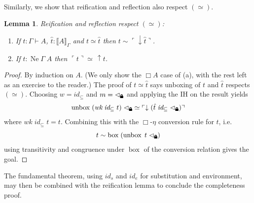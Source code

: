 \documentclass[12pt,twoside,openright]{report}
\numberwithin{equation}{chapter}
\numberwithin{figure}{chapter}
\numberwithin{table}{chapter}
\newtheorem{lemma}[theorem]{Lemma}
\theoremstyle{definition}\newtheorem{definition}{Definition}
\newcommand{\lock}{\text{\tikz[baseline]{
      \fill[rounded corners=.1ex] (-.75ex,0) rectangle (.75ex,1ex);
      \draw[line width=.3ex] (-.4ex,.5ex) -- ++(0,.75ex) arc (180:0:.4ex) -- ++(0,-.75ex);
}}}
\begin{document}
Similarly, we show that reification and reflection also respect $(\simeq)$.
\begin{lemma}
  Reification and reflection respect $(\simeq)$:
  \begin{enumerate}
    \renewcommand{\theenumi}{\alph{enumi}}
  \item If $t : \Gamma \vdash A$, $\hat t : \llbracket A \rrbracket_\Gamma$
    and $t \simeq \hat t$ then $t \sim \ulcorner \downarrow\hat t \urcorner$.
  \item If $t : \operatorname{Ne} \Gamma \; A$ then $\ulcorner t \urcorner \simeq \, \uparrow t$.
  \end{enumerate}
\end{lemma}
\begin{proof}
  By induction on $A$.
  (We only show the $\Box A$ case of (a),
  with the rest left as an exercise to the reader.)
  The proof of $t \simeq \hat t$ says unboxing of $t$ and $\hat t$ respects $(\simeq)$.
  Choosing $w = \textit{id}_\subseteq$ and $m = \lhd_\lock$
  and applying the IH on the result yields
  $$ \operatorname{unbox} \; (\textit{wk} \; \textit{id}_\subseteq \; t) \; \lhd_\lock \simeq \ulcorner \downarrow (\hat t \; \textit{id}_\subseteq \; \lhd_\lock) \urcorner $$
  where $\textit{wk} \; \textit{id}_\subseteq \; t = t$.
  Combining this with the $\Box\text{-}\eta$ conversion rule for $t$, i.e.
  $$ t \sim \operatorname{box} \; (\operatorname{unbox} \; t \; \lhd_\lock) $$
  using transitivity and congruence under $\operatorname{box}$
  of the conversion relation gives the goal.
\end{proof}

The fundamental theorem,
using $\textit{id}_s$ and $\textit{id}_e$ for substitution and environment,
may then be combined with the reification lemma
to conclude the completeness proof.
\end{document}
